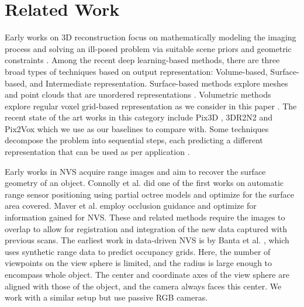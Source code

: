 \section{Related Work}
Early works on 3D reconstruction focus on mathematically modeling the imaging process and solving an ill-posed problem via suitable scene priors and geometric constraints \cite{hartley2003multiple}.
Among the recent deep learning-based methods, there are three broad types of techniques based on output representation: Volume-based, Surface-based, and Intermediate representation.
Surface-based methods explore meshes and point clouds that are unordered representations \cite{wang2018pixel2mesh, kanazawa2018learning, pontes2018image2mesh}. 
Volumetric methods explore regular voxel grid-based representation as we consider in this paper \cite{wu2017marrnet, tulsiani2017multi, yang2018learning}.
The recent state of the art works in this category include Pix3D \cite{sun2018pix3d}, 3DR2N2 \cite{3dr2n2} and Pix2Vox \cite{pix2vox} which we use as our baselines to compare with.
Some techniques decompose the problem into sequential steps, each predicting a different representation that can be used as per application \cite{tatarchenko2016multi, lin2018learning}.


Early works in NVS acquire range images and aim to recover the surface geometry of an object.
Connolly et al. \cite{connolly1985determination} did one of the first works on automatic range sensor positioning using partial octree models and optimize for the surface area covered.
Maver et al. employ occlusion guidance \cite{maver1993occlusions} and optimize for information gained \cite{maver1993planning} for NVS.
These and related methods \cite{pito1996sensor, pito1995solution, pito1999solution} require the images to overlap to allow for registration and integration of the new data captured with previous scans. 
The earliest work in data-driven NVS is by Banta et al. \cite{banta1995best}, which uses synthetic range data to predict occupancy grids.
Here, the number of viewpoints on the view sphere is limited, and the radius is large enough to encompass whole object.
The center and coordinate axes of the view sphere are aligned with those of the object, and the camera always faces this center.
We work with a similar setup but use passive RGB cameras.

